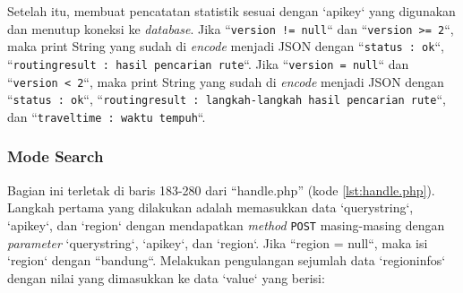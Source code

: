 Setelah itu, membuat pencatatan statistik sesuai dengan `apikey` yang digunakan dan menutup koneksi ke \textit{database}. Jika ``\texttt{version != null}`` dan ``\texttt{version >= 2}``, maka print String yang sudah di \textit{encode} menjadi JSON dengan ``\texttt{status : ok}``, ``\texttt{routingresult : hasil pencarian rute}``. Jika ``\texttt{version = null}`` dan ``\texttt{version < 2}``, maka print String yang sudah di \textit{encode} menjadi JSON dengan ``\texttt{status : ok}``, ``\texttt{routingresult : langkah-langkah hasil pencarian rute}``, dan ``\texttt{traveltime : waktu tempuh}``.

\subsubsection{Mode Search}
Bagian ini terletak di baris 183-280 dari ``handle.php'' (kode \ref{lst:handle.php}). Langkah pertama yang dilakukan adalah memasukkan data `querystring`, `apikey`, dan `region` dengan mendapatkan \textit{method} \verb!POST! masing-masing dengan \textit{parameter} `querystring`, `apikey`, dan `region`. Jika ``region = null``, maka isi `region` dengan ``bandung``. Melakukan pengulangan sejumlah data `regioninfos` dengan nilai yang dimasukkan ke data `value` yang berisi:
